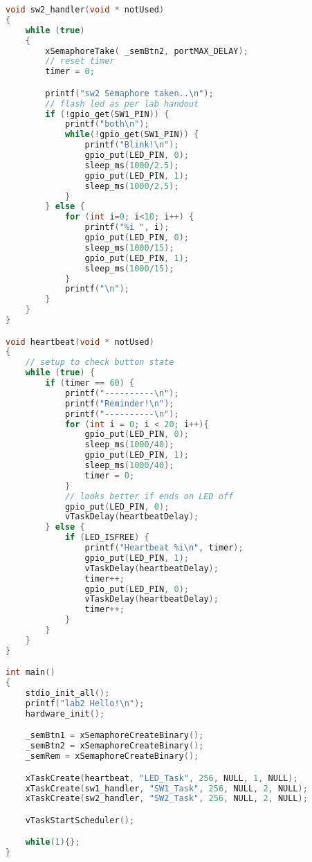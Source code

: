 \documentclass[sigconf]{article}
\begin{document}
\begin{lstlisting}[basicstyle=\footnotesize\ttfamily, language=c,breaklines]
void sw2_handler(void * notUsed)
{
    while (true)
    {
        xSemaphoreTake( _semBtn2, portMAX_DELAY);
        // reset timer
        timer = 0;    

        printf("sw2 Semaphore taken..\n");
        // flash led as per lab handout
        if (!gpio_get(SW1_PIN)) {
            printf("both\n");
            while(!gpio_get(SW1_PIN)) {
                printf("Blink!\n");
                gpio_put(LED_PIN, 0);
                sleep_ms(1000/2.5);
                gpio_put(LED_PIN, 1);
                sleep_ms(1000/2.5);
            }
        } else {
            for (int i=0; i<10; i++) {
                printf("%i ", i);
                gpio_put(LED_PIN, 0);
                sleep_ms(1000/15);
                gpio_put(LED_PIN, 1);
                sleep_ms(1000/15);
            }
            printf("\n");
        }
    }
}

void heartbeat(void * notUsed)
{   
    // setup to check button state
    while (true) {
        if (timer == 60) {
            printf("----------\n");
            printf("Reminder!\n");
            printf("----------\n");
            for (int i = 0; i < 20; i++){
                gpio_put(LED_PIN, 0);
                sleep_ms(1000/40);
                gpio_put(LED_PIN, 1);
                sleep_ms(1000/40);
                timer = 0;
            }
            // looks better if ends on LED off
            gpio_put(LED_PIN, 0);
            vTaskDelay(heartbeatDelay);  
        } else {
            if (LED_ISFREE) {
                printf("Heartbeat %i\n", timer);
                gpio_put(LED_PIN, 1);
                vTaskDelay(heartbeatDelay);
                timer++;
                gpio_put(LED_PIN, 0);
                vTaskDelay(heartbeatDelay);
                timer++;
            }
        }
    }
}

int main()
{
    stdio_init_all();
    printf("lab2 Hello!\n");
    hardware_init();

    _semBtn1 = xSemaphoreCreateBinary();
    _semBtn2 = xSemaphoreCreateBinary();
    _semRem = xSemaphoreCreateBinary();

    xTaskCreate(heartbeat, "LED_Task", 256, NULL, 1, NULL);
    xTaskCreate(sw1_handler, "SW1_Task", 256, NULL, 2, NULL);
    xTaskCreate(sw2_handler, "SW2_Task", 256, NULL, 2, NULL);

    vTaskStartScheduler();

    while(1){};
}

\end{lstlisting}



\end{document}
